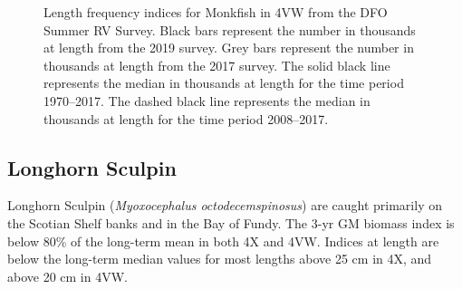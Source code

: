 \documentclass[11pt]{book}
\begin{document}
\begin{figure}[htb]

{\centering {} 

}

\caption{Length frequency indices for Monkfish in 4VW from the DFO Summer RV Survey. Black bars represent the number in thousands at length from the 2019 survey. Grey bars represent the number in thousands at length from the 2017 survey. The solid black line represents the median in thousands at length for the time period 1970--2017. The dashed black line represents the median in thousands at length for the time period 2008--2017.}\label{fig:74-fig-monkfish-lengthfreq4VW}
\end{figure}
\clearpage

\hypertarget{longhorn-sculpin}{%
\subsection{Longhorn Sculpin}\label{longhorn-sculpin}}

Longhorn Sculpin (\emph{Myoxocephalus octodecemspinosus}) are caught primarily on the Scotian Shelf banks and in the Bay of Fundy. The 3-yr GM biomass index is below 80\% of the long-term mean in both 4X and 4VW. Indices at length are below the long-term median values for most lengths above 25 cm in 4X, and above 20 cm in 4VW.
\end{document}
